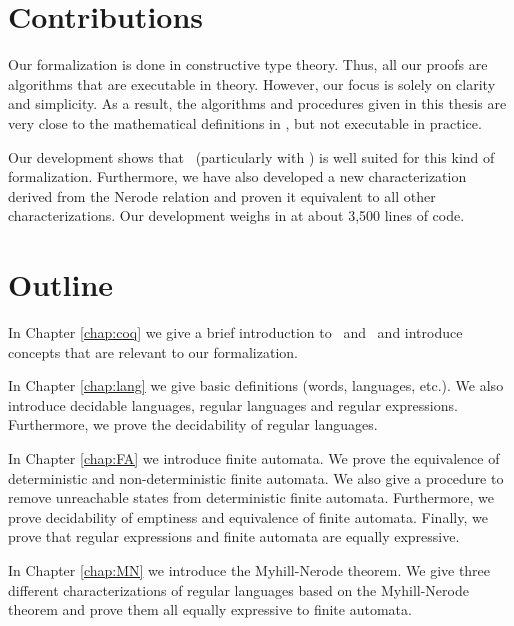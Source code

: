 \section{Contributions}
Our formalization is done in constructive type theory.
Thus, all our proofs are algorithms that are executable in theory.
However, our focus is solely on clarity and simplicity.
As a result, the algorithms and procedures given in this thesis 
are very close to the mathematical definitions in \cite{DBLP:books/daglib/0088160}, 
but not executable in practice. 

Our development shows that \coq\ (particularly with \ssreflect) is well suited for this kind of formalization.
Furthermore, we have also developed a new characterization derived from the Nerode relation and proven it equivalent to all other characterizations.
Our development weighs in at about 3,500 lines of code.


\section{Outline}
In Chapter \ref{chap:coq} we give a brief introduction to \coq\ and \ssreflect\ and introduce concepts that are relevant to our formalization.

In Chapter \ref{chap:lang} we give basic definitions (words, languages, etc.). 
We also introduce decidable languages, regular languages and regular expressions. 
Furthermore, we prove the decidability of regular languages.

In Chapter \ref{chap:FA} we introduce finite automata.
We prove the equivalence of deterministic and non-deterministic finite automata.
We also give a procedure to remove unreachable states from deterministic finite automata.
Furthermore, we prove decidability of emptiness and equivalence of finite automata.
Finally, we prove that regular expressions and finite automata are equally expressive.

In Chapter \ref{chap:MN} we introduce the Myhill-Nerode theorem.
We give three different characterizations of regular languages based on the Myhill-Nerode theorem and prove them all equally expressive to finite automata.

